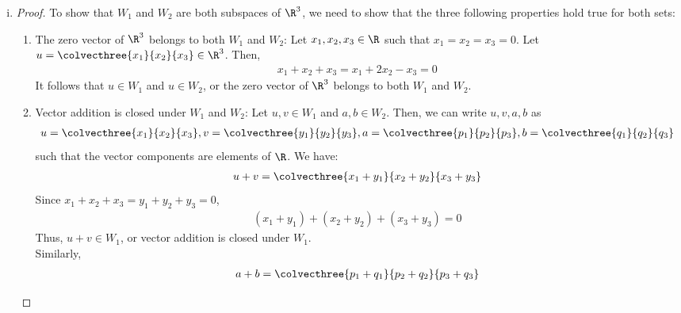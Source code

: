 \begin{sol}
    \begin{enumerate}[(i)]
        \item 
        \renewcommand\qedsymbol{$\blacksquare$}
        \begin{proof}
            To show that $W_1$ and $W_2$ are both subspaces of $\R^{3}$, we need to show that the three following properties hold true for both sets:
            \begin{enumerate}[(1)]
                \item The zero vector of $\R^{3}$ belongs to both $W_1$ and $W_2$: Let $x_1,x_2,x_3\in\R$ such that $x_1=x_2=x_3=0$. Let $u=\colvecthree{x_1}{x_2}{x_3}\in\R^{3}$. Then,
                \[
                    \begin{aligned}
                        x_1+x_2+x_3=x_1+2x_2-x_3=0
                    \end{aligned}
                \]
                It follows that $u\in W_1$ and $u\in W_2$, or the zero vector of $\R^{3}$ belongs to both $W_1$ and $W_2$.
                \item Vector addition is closed under $W_1$ and $W_2$: Let $u,v\in W_1$ and $a,b\in W_2$. Then, we can write $u,v,a,b$ as
                \[
                    \begin{aligned}
                        u = \colvecthree{x_1}{x_2}{x_3},
                        v = \colvecthree{y_1}{y_2}{y_3},
                        a = \colvecthree{p_1}{p_2}{p_3},
                        b = \colvecthree{q_1}{q_2}{q_3}
                    \end{aligned}  
                \]
                such that the vector components are elements of $\R$. We have:
                \[
                    \begin{aligned}
                        u+v = \colvecthree{x_1+y_1}{x_2+y_2}{x_3+y_3}
                    \end{aligned}    
                \]
                Since $x_1+x_2+x_3=y_1+y_2+y_3=0$,
                \[
                    \begin{aligned}
                        (x_1+y_1)+(x_2+y_2)+(x_3+y_3)=0
                    \end{aligned}  
                \]
                Thus, $u+v\in W_1$, or vector addition is closed under $W_1$.\\
                Similarly,
                \[
                    \begin{aligned}
                        a+b = \colvecthree{p_1+q_1}{p_2+q_2}{p_3+q_3}

\end{aligned}\]
\end{enumerate}
\end{proof}
\end{enumerate}
\end{sol}
